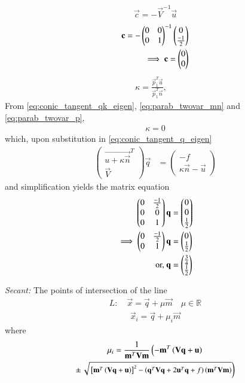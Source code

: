 \documentclass[journal,12pt,twocolumn]{IEEEtran}
\begin{document}
\begin{align}
\boxed{\vec{c} = -\vec{V}^{-1}\vec{u}}\label{eq:1}
\end{align}
\begin{align}
\mathbf{c} = -\begin{pmatrix}0 & 0 \\ 0& 1\end{pmatrix}^{-1}\begin{pmatrix}0\\\frac{-1}{2}\end{pmatrix}\\
\implies\mathbf{c} = \begin{pmatrix}0\\ 0\end{pmatrix}
\end{align}
\begin{align}
\label{eq:conic_tangent_qk_eigen} \kappa = \frac{\vec{p}_1^T\vec{u}}{\vec{p}_1^T\vec{n}}, \quad 
\end{align}
From \eqref{eq:conic_tangent_qk_eigen}, \eqref{eq:parab_twovar_mn} and \eqref{eq:parab_twovar_p},
\begin{align}
\kappa = 0
\end{align}
which, upon substitution in  \eqref{eq:conic_tangent_q_eigen}
\begin{align}
\label{eq:conic_tangent_q_eigen}
\begin{pmatrix}
\vec{u+\kappa \vec{n}}^T \\ \vec{V}
\end{pmatrix}
\vec{q} &= 
\begin{pmatrix}
-f
\\
\kappa\vec{n}-\vec{u}
\end{pmatrix}
\end{align}
and simplification yields the matrix equation
\begin{align}
\begin{pmatrix}0 & \frac{-1}{2}\\0 & 0\\0&1\end{pmatrix}\mathbf{q} &= \begin{pmatrix}0\\0\\\frac{1}{2}\end{pmatrix}
\\
\implies \begin{pmatrix}0 & \frac{-1}{2}\\0&1\end{pmatrix}\mathbf{q} &= \begin{pmatrix}0\\\frac{1}{2}\end{pmatrix}
\\
\text{or, } \mathbf{q} &= \begin{pmatrix}\frac{3}{4}\\\frac{1}{2}\end{pmatrix}
\end{align}
\item 
{\em Secant: }The points of intersection of the line 
\begin{align}
L: \quad \vec{x} = \vec{q} + \mu \vec{m} \quad \mu \in \mathbb{R}
\label{eq:conic_tangent}
\end{align}
\begin{align}\label{eq:parametricform}
\vec{x}_i = \vec{q} + \mu_i \vec{m}
\end{align}
%
where
\begin{multline}
\mu_i = \frac{1}
{
\mathbf{m}^T\mathbf{V}\mathbf{m}
}
\left(-\mathbf{m}^T\left(\mathbf{V}\mathbf{q}+\mathbf{u}\right)\right.
\\
\pm
{\small
\ensuremath{\left.\sqrt{
{}\left[
\mathbf{m}^T\left(\mathbf{V}\mathbf{q}+\mathbf{u}\right)
\right]^2
-
\left(
\mathbf{q}^T\mathbf{V}\mathbf{q} + 2\mathbf{u}^T\mathbf{q} +f
\right)
\left(\mathbf{m}^T\mathbf{V}\mathbf{m}\right)
}
\right)}
}
\label{eq:tangent_roots}
\end{multline}
                    
\end{document}

